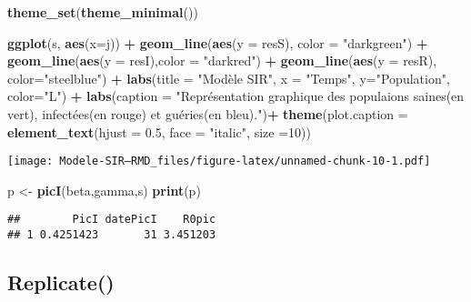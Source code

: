 \documentclass[
]{article}
\newenvironment{Shaded}{\begin{snugshade}}{\end{snugshade}}
\newcommand{\DataTypeTok}[1]{\textcolor[rgb]{0.13,0.29,0.53}{#1}}
\newcommand{\DecValTok}[1]{\textcolor[rgb]{0.00,0.00,0.81}{#1}}
\newcommand{\FloatTok}[1]{\textcolor[rgb]{0.00,0.00,0.81}{#1}}
\newcommand{\KeywordTok}[1]{\textcolor[rgb]{0.13,0.29,0.53}{\textbf{#1}}}
\newcommand{\NormalTok}[1]{#1}
\newcommand{\OperatorTok}[1]{\textcolor[rgb]{0.81,0.36,0.00}{\textbf{#1}}}
\newcommand{\StringTok}[1]{\textcolor[rgb]{0.31,0.60,0.02}{#1}}
\begin{document}
\begin{Shaded}
\begin{Highlighting}[]
\KeywordTok{theme_set}\NormalTok{(}\KeywordTok{theme_minimal}\NormalTok{())}

\KeywordTok{ggplot}\NormalTok{(s, }\KeywordTok{aes}\NormalTok{(}\DataTypeTok{x=}\NormalTok{j)) }\OperatorTok{+}\StringTok{ }\KeywordTok{geom_line}\NormalTok{(}\KeywordTok{aes}\NormalTok{(}\DataTypeTok{y =}\NormalTok{ resS), }\DataTypeTok{color =} \StringTok{"darkgreen"}\NormalTok{) }\OperatorTok{+}\StringTok{ }\KeywordTok{geom_line}\NormalTok{(}\KeywordTok{aes}\NormalTok{(}\DataTypeTok{y =}\NormalTok{ resI),}\DataTypeTok{color =} \StringTok{"darkred"}\NormalTok{) }\OperatorTok{+}\StringTok{ }\KeywordTok{geom_line}\NormalTok{(}\KeywordTok{aes}\NormalTok{(}\DataTypeTok{y =}\NormalTok{ resR), }\DataTypeTok{color=}\StringTok{"steelblue"}\NormalTok{) }\OperatorTok{+}\StringTok{ }\KeywordTok{labs}\NormalTok{(}\DataTypeTok{title =} \StringTok{"Modèle SIR"}\NormalTok{, }\DataTypeTok{x =} \StringTok{"Temps"}\NormalTok{, }\DataTypeTok{y=}\StringTok{"Population"}\NormalTok{, }\DataTypeTok{color=}\StringTok{"L"}\NormalTok{) }\OperatorTok{+}\StringTok{ }\KeywordTok{labs}\NormalTok{(}\DataTypeTok{caption =} \StringTok{"Représentation graphique des populaions saines(en vert), infectées(en rouge) et guéries(en bleu)."}\NormalTok{)}\OperatorTok{+}\StringTok{ }\KeywordTok{theme}\NormalTok{(}\DataTypeTok{plot.caption =} \KeywordTok{element_text}\NormalTok{(}\DataTypeTok{hjust =} \FloatTok{0.5}\NormalTok{, }\DataTypeTok{face =} \StringTok{"italic"}\NormalTok{, }\DataTypeTok{size =}\DecValTok{10}\NormalTok{))}
\end{Highlighting}
\end{Shaded}

\texttt{[image: Modele-SIR---RMD\_files/figure-latex/unnamed-chunk-10-1.pdf]}

\begin{Shaded}
\begin{Highlighting}[]
\NormalTok{p <-}\StringTok{ }\KeywordTok{picI}\NormalTok{(beta,gamma,s)}
\KeywordTok{print}\NormalTok{(p)}
\end{Highlighting}
\end{Shaded}

\begin{verbatim}
##        PicI datePicI    R0pic
## 1 0.4251423       31 3.451203
\end{verbatim}

\hypertarget{replicate}{%
\subsection{Replicate()}\label{replicate}}
\end{document}
